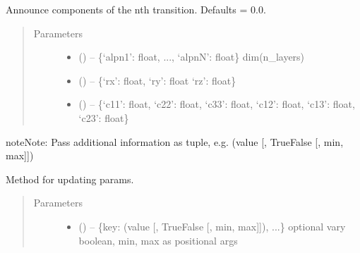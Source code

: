\documentclass[letterpaper,10pt,english]{sphinxmanual}
\begin{document}
\begin{fulllineitems}

\begin{fulllineitems}
\label{\detokenize{rst/transition:mstack.transition.Transition.__init__}}
Announce components of the nth transition. Defaults = 0.0.
\begin{quote}\begin{description}
\item[{Parameters}] \leavevmode\begin{itemize}
\item {} 
 () -- \{`alpn1': float, ..., `alpnN': float\} dim(n\_layers)

\item {} 
 () -- \{`rx': float, `ry': float `rz': float\}

\item {} 
 () -- \{`c11': float, `c22': float, `c33': float, `c12': float, `c13': float, `c23': float\}

\end{itemize}

\end{description}\end{quote}

\begin{sphinxadmonition}{note}{Note:}
Pass additional information  as tuple, e.g.
(value {[}, True\textbar{}False {[}, min, max{]}{]})
\end{sphinxadmonition}

\end{fulllineitems}


\begin{fulllineitems}
\label{\detokenize{rst/transition:mstack.transition.Transition.generic}}
Method for updating params.
\begin{quote}\begin{description}
\item[{Parameters}] \leavevmode\begin{itemize}
\item {} 
 () -- \{key: (value {[}, True\textbar{}False {[}, min, max{]}{]}), ...\}
optional vary boolean, min, max as positional args


\end{itemize}
\end{description}
\end{quote}
\end{fulllineitems}
\end{fulllineitems}
\end{document}
